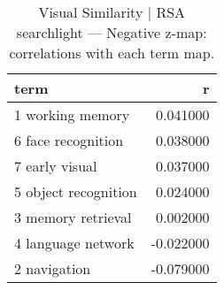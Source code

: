 \begin{table}
\caption{Visual Similarity | RSA searchlight — Negative z-map: correlations with each term map.}
\label{tab:Visual Similarity | RSA searchlight_neg}
\begin{tabular}{lr}
\toprule
term & r \\
\midrule
1 working memory & 0.041000 \\
6 face recognition & 0.038000 \\
7 early visual & 0.037000 \\
5 object recognition & 0.024000 \\
3 memory retrieval & 0.002000 \\
4 language network & -0.022000 \\
2 navigation & -0.079000 \\
\bottomrule
\end{tabular}
\end{table}
